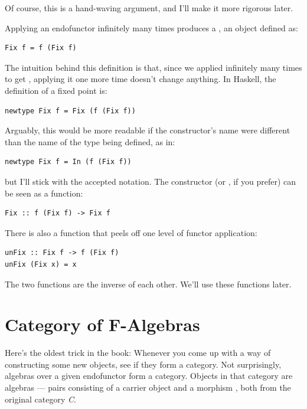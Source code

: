 Of course, this is a hand-waving argument, and I'll make it more
rigorous later.

Applying an endofunctor infinitely many times produces a , an object defined as:

\begin{Verbatim}[commandchars=\\\{\}]
Fix f = f (Fix f)
\end{Verbatim}
The intuition behind this definition is that, since we applied
 infinitely many times to get , applying it one
more time doesn't change anything. In Haskell, the definition of a fixed
point is:

\begin{Verbatim}[commandchars=\\\{\}]
newtype Fix f = Fix (f (Fix f))
\end{Verbatim}
Arguably, this would be more readable if the constructor's name were
different than the name of the type being defined, as in:

\begin{Verbatim}[commandchars=\\\{\}]
newtype Fix f = In (f (Fix f))
\end{Verbatim}
but I'll stick with the accepted notation. The constructor 
(or , if you prefer) can be seen as a function:

\begin{Verbatim}[commandchars=\\\{\}]
Fix :: f (Fix f) -> Fix f
\end{Verbatim}
There is also a function that peels off one level of functor
application:

\begin{Verbatim}[commandchars=\\\{\}]
unFix :: Fix f -> f (Fix f)
unFix (Fix x) = x
\end{Verbatim}
The two functions are the inverse of each other. We'll use these
functions later.

\section{Category of F-Algebras}\label{category-of-f-algebras}

Here's the oldest trick in the book: Whenever you come up with a way of
constructing some new objects, see if they form a category. Not
surprisingly, algebras over a given endofunctor  form a
category. Objects in that category are algebras --- pairs consisting of
a carrier object  and a morphism
, both from the original category
\emph{C}.


